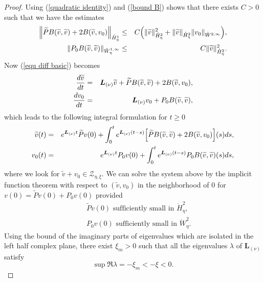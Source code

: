 \documentclass[10pt,a4paper]{amsart}
\begin{document}
\begin{proof}
Using (\ref{quadratic identity}) and (\ref{bound B}) shows that there exists 
$C>0$ such that we have the estimates%
\begin{eqnarray*}
\Bigl\|\widetilde{P}B(\widetilde{v},\widetilde{v})+2B(\widetilde{v},v_{0})\Bigr\|_{%
\mathring{H}_{\eta}^{1}} &\leq &C \Bigl(\|\widetilde{v}\|_{\mathring{H}%
_{\eta}^{2}}^{2}+\|\widetilde{v}\|_{\mathring{H}_{\eta}^{2}}\|v_{0}\|_{\mathring{W}%
^{2,\infty }} \Bigr), \\
\|P_{0}B(\widetilde{v},\widetilde{v})\|_{\mathring{W}_{\eta}^{1,\infty }} &\leq
&C\|\widetilde{v}\|_{\mathring{H}_{\eta}^{2}}^{2}.
\end{eqnarray*}
Now (\ref{equ diff basic}) becomes%
\begin{eqnarray*}
\frac{d\widetilde{v}}{dt} &=&\boldsymbol{L}_{(\nu )}\widetilde{v}+\widetilde{%
P}B(\widetilde{v},\widetilde{v})+2B(\widetilde{v},v_{0}), \\
\frac{dv_{0}}{dt} &=&\boldsymbol{L}_{(\nu )}v_{0}+P_{0}B(\widetilde{v},%
\widetilde{v}),
\end{eqnarray*}%
which leads to the following integral formulation for $t\geq 0$%
\begin{eqnarray}
\widetilde{v}(t) &=&e^{\boldsymbol{L}_{(\nu )}t}\widetilde{P}%
v(0)+\int_{0}^{t}e^{\boldsymbol{L}_{(\nu )}(t-s)} \Bigl[\widetilde{P}B(\widetilde{v%
},\widetilde{v})+2B(\widetilde{v},v_{0}) \Bigr](s)ds,  \label{compvtilde} \\
v_{0}(t) &=&e^{\boldsymbol{L}_{(\nu )}t}P_{0}v(0)+\int_{0}^{t}e^{\boldsymbol{%
L}_{(\nu )}(t-s)}P_{0}B(\widetilde{v},\widetilde{v})(s)ds,  \label{compv0}
\end{eqnarray}%
where we look for $\widetilde{v}+v_{0}\in \mathcal{Z}_{\eta,\xi }.$ 
We can solve the system above by the implicit function theorem with respect
to $(\widetilde{v},v_{0})$ in the neighborhood of $0$ for $v(0)=\widetilde{P}%
v(0)+P_{0}v(0)$ provided 
\begin{eqnarray*}
&&\widetilde{P}v(0)\text{ sufficiently small in }\mathring{H}_{\eta}^{2}, \\
&&P_{0}v(0)\text{ sufficiently small in }\mathring{W}_{\eta}^{2}.
\end{eqnarray*}
Using the bound of the imaginary parts of eigenvalues which are isolated in
the left half complex plane, there exist $\xi_{m}>0$
such that all the eigenvalues $\lambda $ of $\boldsymbol{L}_{(\nu )}$ satisfy%
\begin{equation*}
\sup \Re \lambda =-\xi_{m} <-\xi  <0.
\end{equation*}%

\end{proof}
\end{document}
